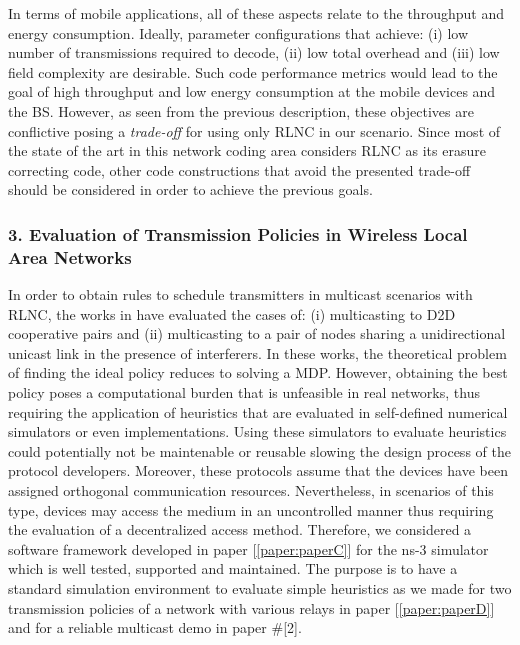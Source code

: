 In terms of mobile applications, all of these aspects relate to the throughput and energy consumption. Ideally, parameter configurations that achieve: (i) low number of transmissions required to decode, (ii) low total overhead and (iii) low field complexity are desirable. Such code performance metrics would lead to the goal of high throughput and low energy consumption at the mobile devices and the \ac{BS}. However, as seen from the previous description, these objectives are conflictive posing a \textit{trade-off} for using only \ac{RLNC} in our scenario. Since most of the state of the art in this network coding area considers \ac{RLNC} as its erasure correcting code, other code constructions that avoid the presented trade-off should be considered in order to achieve the previous goals.

\subsubsection{3. Evaluation of Transmission Policies in Wireless Local Area Networks}
In order to obtain rules to schedule transmitters in multicast scenarios with \ac{RLNC}, the works in \cite{khamfroush2013minimizing,khamfroush2015optimal,khamfroush2014coded} have evaluated the cases of: (i) multicasting to \ac{D2D} cooperative pairs and (ii) multicasting to a pair of nodes sharing a unidirectional unicast link in the presence of interferers. In these works, the theoretical problem of finding the ideal policy reduces to solving a \ac{MDP}. However, obtaining the best policy poses a computational burden that is unfeasible in real networks, thus requiring the application of heuristics that are evaluated in self-defined numerical simulators or even implementations. Using these simulators to evaluate heuristics could potentially not be maintenable or reusable slowing the design process of the protocol developers. Moreover, these protocols assume that the devices have been assigned orthogonal communication resources. Nevertheless, in scenarios of this type, devices may access the medium in an uncontrolled manner thus requiring the evaluation of a decentralized access method. Therefore, we considered a software framework developed in paper {[\ref{paper:paperC}]} for the ns-3 simulator \cite{ns3link} which is well tested, supported and maintained. The purpose is to have a standard simulation environment to evaluate simple heuristics as we made for two transmission policies of a network with various relays in paper {[\ref{paper:paperD}]} and for a reliable multicast demo in paper \#[2].

